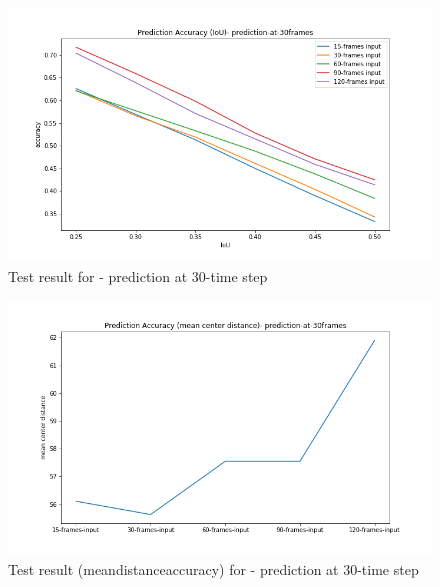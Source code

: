 \begin{figure}[H] 
\includegraphics[scale=0.8]{prediction-at-30frames_IoU}
\begin{center}
\caption{Test result for - prediction at 30-time step }
\label{30-IoU}
\end{center}
\end{figure}

\begin{figure}[H] 
\includegraphics[scale=0.8]{prediction-at-30frames-mean_distance_accuracy}
\begin{center}
\caption{Test result (mean\textunderscore distance\textunderscore accuracy) for - prediction at 30-time step }
\label{30-mcd}
\end{center}
\end{figure}


